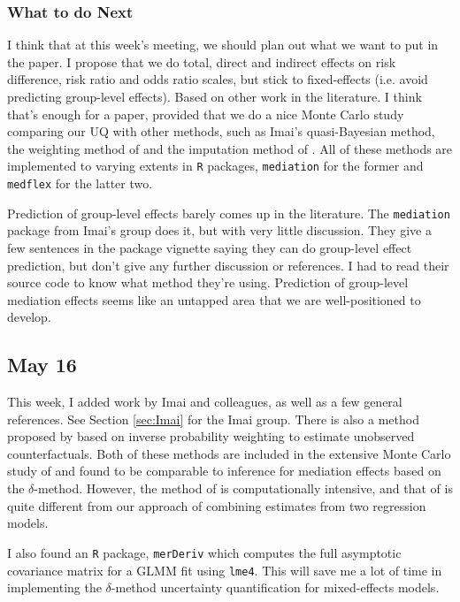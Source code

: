 \documentclass{article}
\begin{document}
\subsubsection{What to do Next}

I think that at this week's meeting, we should plan out what we want to put in the paper. I propose that we do total, direct and indirect effects on risk difference, risk ratio and odds ratio scales, but stick to fixed-effects (i.e. avoid predicting group-level effects). Based on other work in the literature. I think that's enough for a paper, provided that we do a nice Monte Carlo study comparing our UQ with other methods, such as Imai's quasi-Bayesian method, the weighting method of \citet{Lan12} and the imputation method of \citet{Van12}. All of these methods are implemented to varying extents in \texttt{R} packages, \texttt{mediation} for the former and \texttt{medflex} for the latter two.

Prediction of group-level effects barely comes up in the literature. The \texttt{mediation} package from Imai's group does it, but with very little discussion. They give a few sentences in the package vignette saying they can do group-level effect prediction, but don't give any further discussion or references. I had to read their source code to know what method they're using. Prediction of group-level mediation effects seems like an untapped area that we are well-positioned to develop. 



\subsection{May 16}

This week, I added work by Imai and colleagues, as well as a few general references. See Section \ref{sec:Imai} for the Imai group. There is also a method proposed by \citet{Lan12} based on inverse probability weighting to estimate unobserved counterfactuals. Both of these methods are included in the extensive Monte Carlo study of \citet{Sam23} and found to be comparable to inference for mediation effects based on the $\delta$-method. However, the method of \citet{Ima10I} is computationally intensive, and that of \citet{Lan12} is quite different from our approach of combining estimates from two regression models.

I also found an \texttt{R} package, \texttt{merDeriv} \citep{Wan18} which computes the full asymptotic covariance matrix for a GLMM fit using \texttt{lme4}. This will save me a lot of time in implementing the $\delta$-method uncertainty quantification for mixed-effects models. 
\end{document}

